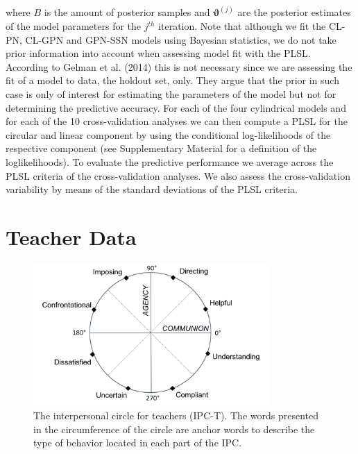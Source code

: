 \documentclass[man,mask]{apa6}
\begin{document}
\noindent where \(B\) is the amount of posterior samples and
\(\boldsymbol{\vartheta}^{(j)}\) are the posterior estimates of the model
parameters for the \(j^{th}\) iteration. Note that although we fit the CL-PN,
CL-GPN and GPN-SSN models using Bayesian statistics, we do not take prior
information into account when assessing model fit with the PLSL. According to
Gelman et al. (2014) this is not necessary since we are assessing the fit of a model to data,
the holdout set, only. They argue that the prior in such case is only of
interest for estimating the parameters of the model but not for determining the
predictive accuracy.\newline
\indent For each of the four cylindrical models and for each of the 10
cross-validation analyses we can then compute a PLSL for the circular and linear
component by using the conditional log-likelihoods of the respective component (see
Supplementary Material for a definition of the loglikelihoods). To evaluate the
predictive performance we average across the PLSL criteria of the
cross-validation analyses. We also assess the cross-validation variability by
means of the standard deviations of the PLSL criteria.

\section{Teacher Data}\label{Example}
\begin{figure}
\centering
\includegraphics[width = 0.8\textwidth]{Plots/IPC-T.png}
\caption{The interpersonal circle for teachers (IPC-T). The words presented in
the circumference of the circle are anchor words to describe the type of
behavior located in each part of the IPC.}
\label{QTI}
\end{figure}
\end{document}
